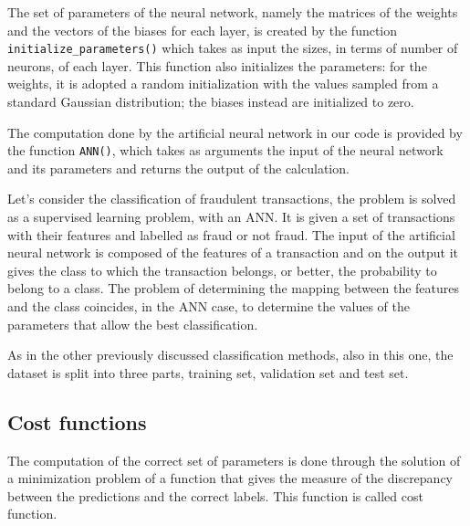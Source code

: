 \documentclass{Configuration_Files/PoliMi3i_thesis}
\begin{document}
The set of parameters of the neural network, namely the matrices of the weights and the vectors of the biases for each layer, is created by the function \verb|initialize_parameters()| which takes as input the sizes, in terms of number of neurons, of each layer.
This function also initializes the parameters: for the weights, it is adopted a random initialization with the values sampled from a standard Gaussian distribution; the biases instead are initialized to zero.

The computation done by the artificial neural network in our code is provided by the function \verb|ANN()|, which takes as arguments the input of the neural network and its parameters and returns the output of the calculation.

Let's consider the classification of fraudulent transactions, the problem is solved as a supervised learning problem, with an ANN.
It is given a set of transactions with their features and labelled as fraud or not fraud. The input of the artificial neural network is composed of the features of a transaction and on the output it gives the class to which the transaction belongs, or better, the probability to belong to a class.
The problem of determining the mapping between the features and the class coincides, in the ANN case, to determine the values of the parameters that allow the best classification.

As in the other previously discussed classification methods, also in this one, the dataset is split into three parts, training set, validation set and test set.

\subsection{Cost functions}

The computation of the correct set of parameters is done through the solution of a minimization problem of a function that gives the measure of the discrepancy between the predictions and the correct labels. This function is called cost function.
\end{document}
